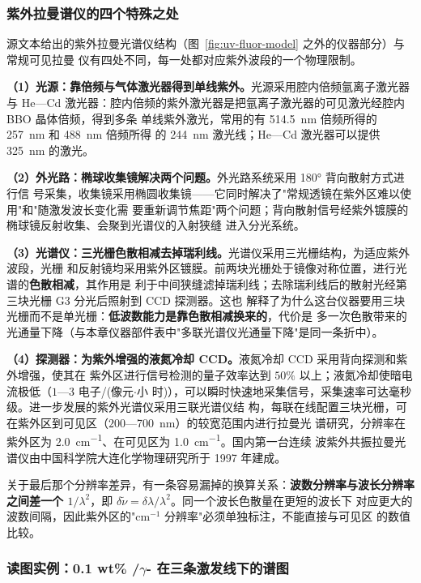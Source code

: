 \subsubsection{紫外拉曼谱仪的四个特殊之处}

源文本给出的紫外拉曼光谱仪结构（图~\ref{fig:uv-fluor-model} 之外的仪器部分）与常规可见拉曼
仪有四处不同，每一处都对应紫外波段的一个物理限制。

\textbf{（1）光源：靠倍频与气体激光器得到单线紫外。}光源采用腔内倍频氩离子激光器与
He—Cd 激光器：腔内倍频的紫外激光器是把氩离子激光器的可见激光经腔内 BBO 晶体倍频，得到多条
单线紫外激光，常用的有 \qty{514.5}{nm} 倍频所得的 \qty{257}{nm} 和 \qty{488}{nm} 倍频所得
的 \qty{244}{nm} 激光线；He—Cd 激光器可以提供 \qty{325}{nm} 的激光。

\textbf{（2）外光路：椭球收集镜解决两个问题。}外光路系统采用 180° 背向散射方式进行信
号采集，收集镜采用椭圆收集镜——它同时解决了"常规透镜在紫外区难以使用"和"随激发波长变化需
要重新调节焦距"两个问题；背向散射信号经紫外镀膜的椭球镜反射收集、会聚到光谱仪的入射狭缝
进入分光系统。

\textbf{（3）光谱仪：三光栅色散相减去掉瑞利线。}光谱仪采用三光栅结构，为适应紫外波段，光栅
和反射镜均采用紫外区镀膜。前两块光栅处于镜像对称位置，进行光谱的\textbf{色散相减}，其作用是
利于中间狭缝滤掉瑞利线；去除瑞利线后的散射光经第三块光栅 G3 分光后照射到 CCD 探测器。这也
解释了为什么这台仪器要用三块光栅而不是单光栅：\textbf{低波数能力是靠色散相减换来的}，代价是
多一次色散带来的光通量下降（与本章仪器部件表中"多联光谱仪光通量下降"是同一条折中）。

\textbf{（4）探测器：为紫外增强的液氮冷却 CCD。}液氮冷却 CCD 采用背向探测和紫外增强，使其在
紫外区进行信号检测的量子效率达到 $50\%$ 以上；液氮冷却使暗电流极低（$1$—$3$ 电子/(像元$\cdot$小
时)），可以瞬时快速地采集信号，采集速率可达毫秒级。进一步发展的紫外光谱仪采用三联光谱仪结
构，每联在线配置三块光栅，可在紫外区到可见区（$200$—\qty{700}{nm}）的较宽范围内进行拉曼光
谱研究，分辨率在紫外区为 \qty{2.0}{cm^{-1}}、在可见区为 \qty{1.0}{cm^{-1}}。国内第一台连续
波紫外共振拉曼光谱仪由中国科学院大连化学物理研究所于 1997 年建成。

关于最后那个分辨率差异，有一条容易漏掉的换算关系：\textbf{波数分辨率与波长分辨率之间差一个
$1/\lambda^2$}，即 $\delta\tilde\nu=\delta\lambda/\lambda^2$。同一个波长色散量在更短的波长下
对应更大的波数间隔，因此紫外区的"$\mathrm{cm^{-1}}$ 分辨率"必须单独标注，不能直接与可见区
的数值比较。

\subsubsection{读图实例：0.1 wt\% /$\gamma$- 在三条激发线下的谱图}
\label{sec:ch06b-mo-instance}

